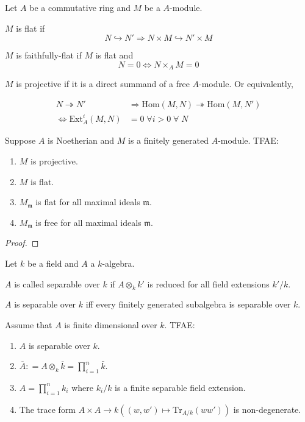 \documentclass[oneside, 12pt, ]{scrbook}
\newcommand{\m}{\mathfrak{m}}
\newcommand{\Hom}{\mathrm{Hom}}
\theoremstyle{theorem}
\begin{document}
Let $A$ be a commutative ring and $M$ be a $A$-module. 

\begin{definition}
$M$ is flat if $$N \hookrightarrow N' \Rightarrow N \times M \hookrightarrow N' \times M$$
\end{definition}

\begin{definition}
$M$ is faithfully-flat if $M$ is flat and  $$N =0 \Leftrightarrow N \times_{A} M =0$$
\end{definition}

\begin{definition}
$M$ is projective if it is a direct summand of a free $A$-module. Or equivalently,

\begin{align*}
N \twoheadrightarrow N' &\Rightarrow \Hom(M, N) \twoheadrightarrow \Hom(M, N')\\
\Leftrightarrow \mathrm{Ext}_{A}^{i} (M,N) &= 0 \; \forall i >0 \; \forall \; N
\end{align*}
\end{definition}

\begin{lemma}
Suppose $A$ is Noetherian and $M$ is a finitely generated $A$-module. TFAE: 
\begin{enumerate}
\item $M$ is projective.
\item $M$ is flat.
\item $M_{\m}$ is flat for all maximal ideals $\m$.
\item $M_{\m}$ is free for all maximal ideals $\m$.
\end{enumerate}
\end{lemma}

\begin{proof}

\end{proof}

Let $k$ be a field and $A$ a $k$-algebra.

\begin{definition}
$A$ is called separable over $k$ if $A \otimes_{k} k'$ is reduced for all field extensions $k' /k$.
\end{definition}

\begin{lemma}
$A$ is separable over $k$ iff every finitely generated subalgebra is separable over $k$.
\end{lemma}

\begin{proposition}
Assume that $A$ is finite dimensional over $k$. TFAE:
\begin{enumerate}
\item $A$ is separable over $k$.
\item $\overline{A}: = A \otimes_{k} \overline{k} = \prod_{i=1}^n \bar{k}$.
\item $A = \prod_{i=1}^n k_{i}$ where $k_{i}/k$ is a finite separable field extension.
\item The trace form $A \times A \rightarrow k ((w,w') \mapsto \mathrm{Tr}_{A/k}(ww'))$ is non-degenerate.
\end{enumerate}
\end{proposition}
\end{document}
